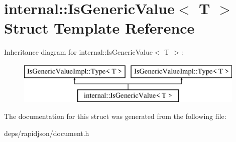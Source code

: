 \hypertarget{structinternal_1_1_is_generic_value}{}\section{internal\+:\+:Is\+Generic\+Value$<$ T $>$ Struct Template Reference}
\label{structinternal_1_1_is_generic_value}
Inheritance diagram for internal\+:\+:Is\+Generic\+Value$<$ T $>$\+:\begin{figure}[H]
\begin{center}
\leavevmode
\includegraphics[height=2.000000cm]{structinternal_1_1_is_generic_value}
\end{center}
\end{figure}


The documentation for this struct was generated from the following file\+:\begin{DoxyCompactItemize}
\item 
deps/rapidjson/document.\+h\end{DoxyCompactItemize}
